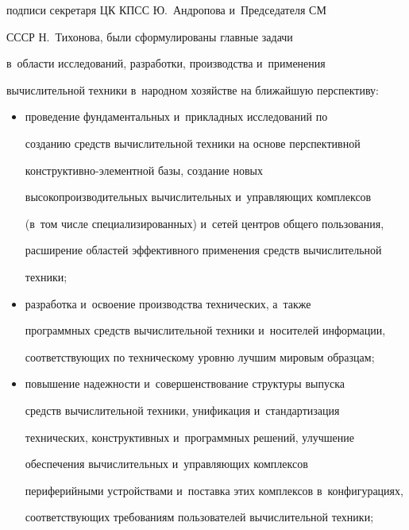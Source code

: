 подписи секретаря ЦК КПСС Ю.~Анд\-ро\-по\-ва и~Председателя СМ 

\mbox{СССР} Н.~Тихонова, были сформулированы глав\-ные задачи  

в~об\-ласти исследований, разработки, производства и~применения 

вы\-чис\-ли\-тель\-ной техники в~народном хозяйстве на ближайшую перспективу:\\[-15pt]

   \begin{itemize}

   \item проведение фундаментальных и~при\-клад\-ных исследований по 

созданию средств вы\-чис\-ли\-тель\-ной техники на основе перспективной  

кон\-ст\-рук\-тив\-но-эле\-мент\-ной базы, создание новых 

высокопроизводительных вы\-чис\-ли\-тель\-ных и~управ\-ля\-ющих комплексов 

(в~том числе специализированных) и~сетей цент\-ров общего пользования, 

расширение областей эффективного применения средств вы\-чис\-ли\-тель\-ной 

техники;\\[-13.5pt]

   \item разработка и~освоение производства технических, а~так\-же 

программных средств вы\-чис\-ли\-тель\-ной техники и~носителей информации, 

со\-от\-вет\-ст\-ву\-ющих по техническому уров\-ню лучшим мировым образцам;\\[-13.5pt]

   \item повышение на\-деж\-ности и~совершенствование структуры выпуска 

средств вы\-чис\-ли\-тель\-ной техники, унификация и~стандартизация 

технических, конструктивных и~программных решений, улуч\-ше\-ние 

обеспечения вы\-чис\-ли\-тель\-ных и~управ\-ля\-ющих комплексов 

периферийными устройствами и~по\-став\-ка этих комплексов в~конфигурациях, 

со\-от\-вет\-ст\-ву\-ющих требованиям пользователей вы\-чис\-ли\-тель\-ной техники;\\[-13.5pt]


\end{itemize}
